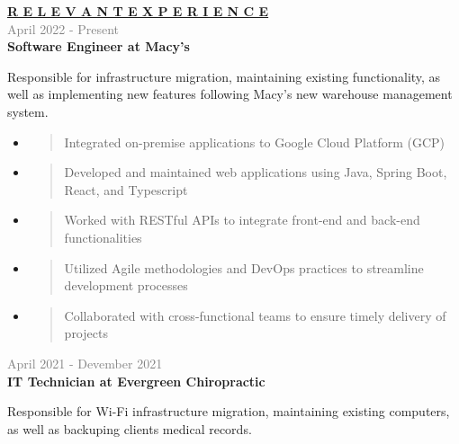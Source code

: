 \documentclass[letterpage]{article}
\begin{document}
\begin{minipage}[t]{0.61\linewidth}
\vspace{0pt}
\textbf{\fontsize{14px}{1px}\selectfont
  \ul{R E L E V A N T \:\: E X P E R I E N C E}
}\\

\vspace{7px}
\textcolor{gray}{April 2022 - Present}\\
\textbf{\textsf{Software Engineer at Macy's}}\\
\raggedright
Responsible for infrastructure migration, maintaining existing functionality, as
well as implementing new features following Macy's new warehouse management system.
\begin{itemize}[leftmargin=*,labelindent=1mm,labelsep=0mm]
\item
  \begin{quote}
  \raggedright
  Integrated on-premise applications to Google Cloud Platform (GCP)
  \end{quote}
\item
  \begin{quote}
  \raggedright
  Developed and maintained web applications using Java, Spring Boot, React, and Typescript
  \end{quote}
\item
  \begin{quote}
  \raggedright
  Worked with RESTful APIs to integrate front-end and back-end functionalities
  \end{quote}
\item
  \begin{quote}
  \raggedright
  Utilized Agile methodologies and DevOps practices to streamline development processes
  \end{quote}
\item
  \begin{quote}
  \raggedright
  Collaborated with cross-functional teams to ensure timely delivery of projects
  \end{quote}
\end{itemize}

\vspace{7px}
\textcolor{gray}{April 2021 - Devember 2021}\\
\textbf{\textsf{IT Technician at Evergreen Chiropractic}}\\
\raggedright
Responsible for Wi-Fi infrastructure migration,
maintaining existing computers, as well as backuping clients medical records.


\end{minipage}
\end{document}
